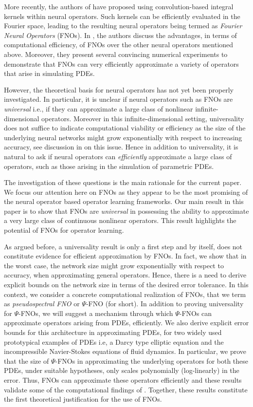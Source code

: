 \documentclass[reqno,a4paper]{amsart}
\begin{document}
More recently, the authors of \cite{fourierop2020} have proposed using convolution-based integral kernels within neural operators. Such kernels can be efficiently evaluated in the Fourier space, leading to the resulting neural operators being termed as \emph{Fourier Neural Operators} (FNOs). In \cite{fourierop2020}, the authors discuss the advantages, in terms of computational efficiency, of FNOs over the other neural operators mentioned above. Moreover, they present several convincing numerical experiments to demonstrate that FNOs can very efficiently approximate a variety of operators that arise in simulating PDEs. 

However, the theoretical basis for neural operators has not yet been properly investigated. In particular, it is unclear if neural operators such as FNOs are \emph{universal} i.e., if they can approximate a large class of nonlinear infinite-dimensional operators. Moreover in this infinite-dimensional setting, universality does not suffice to indicate computational viability or efficiency as the size of the underlying neural networks might grow exponentially with respect to increasing accuracy, see discussion in \cite{LMK2021} on this issue. Hence in addition to universality, it is natural to ask if neural operators can \emph{efficiently} approximate a large class of operators, such as those arising in the simulation of parametric PDEs. 

The investigation of these questions is the main rationale for the current paper. We focus our attention here on FNOs as they appear to be the most promising of the neural operator based operator learning frameworks. Our main result in this paper is to show that FNOs are \emph{universal} in possessing the ability to approximate a very large class of continuous nonlinear operators. This result highlights the potential of FNOs for operator learning. 

As argued before, a universality result is only a first step and by itself, does not constitute evidence for efficient approximation by FNOs. In fact, we show that in the worst case, the network size might grow exponentially with respect to accuracy, when approximating general operators. Hence, there is a need to derive explicit bounds on the network size in terms of the desired error tolerance. In this context, we consider a concrete computational realization of FNOs, that we term as \emph{pseudospectral FNO} or $\Psi$-FNO (for short). In addition to proving universality for $\Psi$-FNOs, we will suggest a mechanism through which $\Psi$-FNOs can approximate operators arising from PDEs, efficiently. We also derive explicit error bounds for this architecture in approximating PDEs, for two widely used prototypical examples of PDEs i.e, a Darcy type elliptic equation and the incompressible Navier-Stokes equations of fluid dynamics. In particular, we prove that the size of $\Psi$-FNOs in approximating the underlying operators for both these PDEs, under suitable hypotheses, only scales polynomially (log-linearly) in the error. Thus, FNOs can approximate these operators efficiently and these results validate some of the computational findings of \cite{fourierop2020}.  Together, these results constitute the first theoretical justification for the use of FNOs. 
\end{document}
